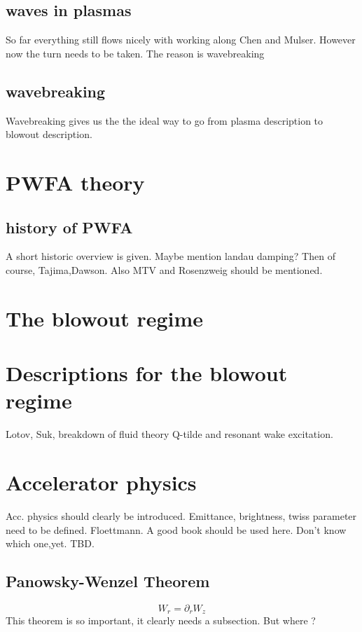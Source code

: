 \subsection{waves in plasmas}
So far everything still flows nicely with working along Chen and Mulser. However now the turn needs to be taken.
The reason is wavebreaking
\subsection{wavebreaking}
Wavebreaking gives us the the ideal way to go from plasma description to blowout description.
\section{PWFA theory}
\subsection{history of PWFA}
A short historic overview is given. 
Maybe mention landau damping? Then of course, Tajima,Dawson. Also MTV and Rosenzweig should be mentioned.

\section{The blowout regime}

\section{Descriptions for the blowout regime}
Lotov, Suk, breakdown of fluid theory
Q-tilde and resonant wake excitation.


\section{Accelerator physics}
Acc. physics should clearly be introduced. Emittance, brightness, twiss parameter need to be defined. Floettmann. A good book should be used here. Don't know which one,yet. TBD.
\subsection{Panowsky-Wenzel Theorem}
 \begin{equation}
W_r =\partial_r W_z
\end{equation} 
This theorem is so important, it clearly needs a subsection. But where ?


